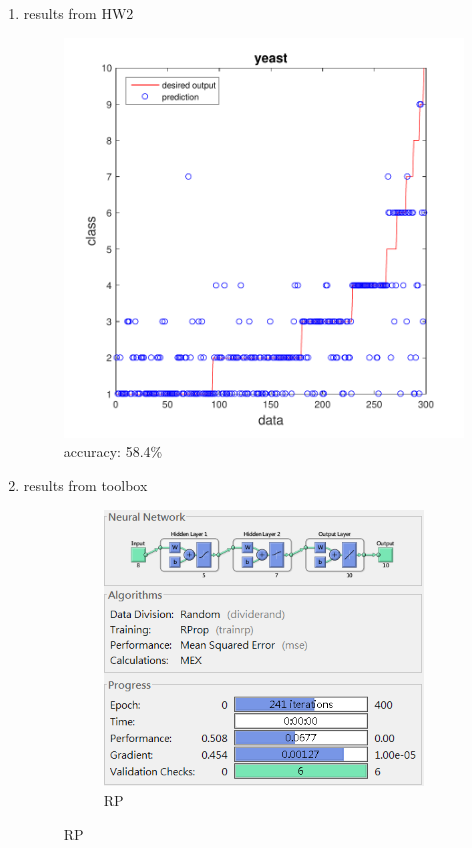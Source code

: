 \documentclass[12pt,a4paper]{article}
\begin{document}
\begin{CJK}{UTF8}{bsmi}
\begin{enumerate}
\begin{enumerate}
	 	\item results from HW2 
	 	\\
	 	\begin{figure}[H]
	 		\centering
	 		\includegraphics[scale=0.6]{yeasths2}
	 		\caption{accuracy: 58.4\%} 
	 	\end{figure}
	 	\newpage
	 	\item results from toolbox 
	 	\begin{figure}[H]
	 		\centering
	 		\begin{subfigure}{.5\textwidth}
	 			\centering
	 			\includegraphics[width=0.92\linewidth]{RP4}
	 			\caption{RP}
	 			

\end{subfigure}
\end{figure}
\end{enumerate}
\end{enumerate}
\end{CJK}
\end{document}
